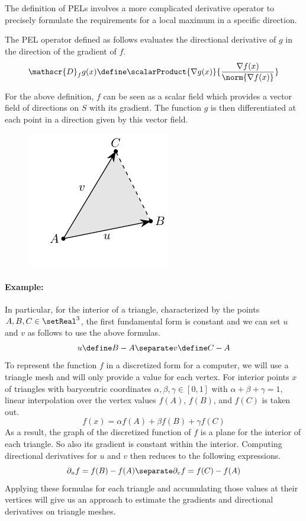\documentclass[9pt,fleqn,twoside,twocolumn]{stdglobal}
\begin{document}
  \noindent
  The definition of PELs involves a more complicated derivative operator to precisely formulate the requirements for a local maximum in a specific direction.

  \begin{definition*}
    The PEL operator defined as follows evaluates the directional derivative of $g$ in the direction of the gradient of $f$.
    \[
      \mathscr{D}_f g(x) \define \scalarProduct{\nabla g(x)}{\frac{\nabla f(x)}{\norm{\nabla f(x)}}}
    \]
  \end{definition*}

  \noindent
  For the above definition, $f$ can be seen as a scalar field which provides a vector field of directions on $S$ with its gradient.
  The function $g$ is then differentiated at each point in a direction given by this vector field.

  \begin{figure}[h]
    \centering
    \includegraphics[width=0.6\linewidth]{figures/triangle.pdf}
  \end{figure}

  \noindent
  \paragraph{Example:}
  In particular, for the interior of a triangle, characterized by the points $A,B,C\in\setReal^3$, the first fundamental form is constant and we can set $u$ and $v$ as follows to use the above formulas.
  \[
    u\define B-A
    \separate
    v\define C-A
  \]
  To represent the function $f$ in a discretized form for a computer, we will use a triangle mesh and will only provide a value for each vertex.
  For interior points $x$ of triangles with barycentric coordinates $α,β,γ\in[0,1]$ with $α+β+γ=1$, linear interpolation over the vertex values $f(A)$, $f(B)$, and $f(C)$ is taken out.
  \[
    f(x) = α f(A) + β f(B) + γ f(C)
  \]
  As a result, the graph of the discretized function of $f$ is a plane for the interior of each triangle.
  So also its gradient is constant within the interior.
  Computing directional derivatives for $u$ and $v$ then reduces to the following expressions.
  \[
    \partial_u f = f(B)-f(A)
    \separate
    \partial_v f = f(C)-f(A)
  \]
  Applying these formulas for each triangle and accumulating those values at their vertices will give us an approach to estimate the gradients and directional derivatives on triangle meshes.
\end{document}
